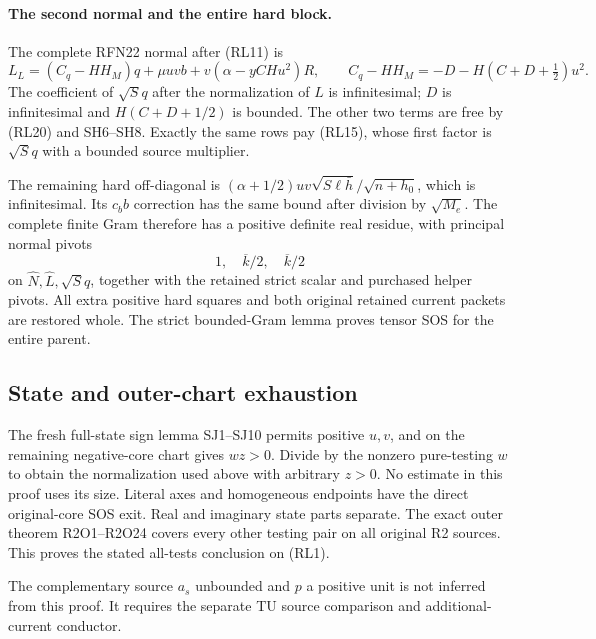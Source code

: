 \paragraph{The second normal and the entire hard block.}
The complete RFN22 normal after (RL11) is
\[
 L_L=(C_q-HH_M)q+\mu uvb+v(\alpha-yCHu^2)R,\qquad
 C_q-HH_M=-D-H(C+D+\tfrac12)u^2 .                      \tag{RL23}
\]
The coefficient of \(\sqrt S q\) after the normalization
of \(L\) is infinitesimal; \(D\) is infinitesimal and
\(H(C+D+1/2)\) is bounded.
The other two terms are free by (RL20) and SH6--SH8.
Exactly the same rows pay (RL15), whose first factor is
\(\sqrt S q\) with a bounded source multiplier.

The remaining hard off-diagonal is
\((\alpha+1/2)uv\sqrt{S\ell\bar h}/\sqrt{n+h_0}\),
which is infinitesimal.  Its \(c_b b\) correction has the
same bound after division by \(\sqrt{M_e}\).
The complete finite Gram therefore has a positive definite
real residue, with principal normal pivots
\[
                   1,\quad\overline k/2,\quad\overline k/2
                                                               \tag{RL24}
\]
on \(\widehat N,\widehat L,\sqrt S q\), together with the
retained strict scalar and purchased helper pivots.
All extra positive hard squares and both original retained
current packets are restored whole.  The strict bounded-Gram
lemma proves tensor SOS for the entire parent.

\subsection{State and outer-chart exhaustion}

The fresh full-state sign lemma SJ1--SJ10 permits positive
\(u,v\), and on the remaining negative-core chart gives
\(wz>0\).  Divide by the nonzero pure-testing \(w\) to obtain
the normalization used above with arbitrary \(z>0\).
No estimate in this proof uses its size.  Literal axes and
homogeneous endpoints have the direct original-core SOS exit.
Real and imaginary state parts separate.
The exact outer theorem R2O1--R2O24 covers every other testing
pair on all original R2 sources.  This proves the stated
all-tests conclusion on (RL1).

The complementary source \(a_s\) unbounded and \(p\) a positive
unit is not inferred from this proof.  It requires the separate
TU source comparison and additional-current conductor.
